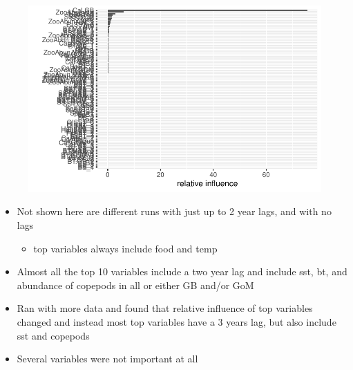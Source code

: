 \documentclass[
  letterpaper,
  DIV=11,
  numbers=noendperiod]{scrartcl}
\providecommand{\tightlist}{%
  \setlength{\itemsep}{0pt}\setlength{\parskip}{0pt}}\usepackage{longtable,booktabs,array}
\begin{document}
\begin{figure}[H]

{\centering \includegraphics{Preliminary-Results_files/figure-pdf/Boosted Regression Trees-3.pdf}

}

\end{figure}

\begin{itemize}
\item
  Not shown here are different runs with just up to 2 year lags, and
  with no lags

  \begin{itemize}
  \tightlist
  \item
    top variables always include food and temp
  \end{itemize}
\item
  Almost all the top 10 variables include a two year lag and include
  sst, bt, and abundance of copepods in all or either GB and/or GoM
\item
  Ran with more data and found that relative influence of top variables
  changed and instead most top variables have a 3 years lag, but also
  include sst and copepods
\item
  Several variables were not important at all
\end{itemize}
\end{document}
